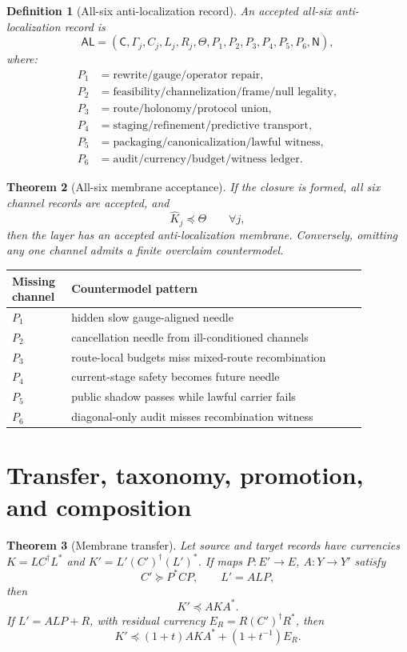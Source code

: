 \documentclass[11pt]{article}
\newtheorem{theorem}{Theorem}[section]
\newtheorem{definition}[theorem]{Definition}
\newcommand{\AL}{\mathsf{AL}}
\begin{document}
\begin{definition}[All-six anti-localization record]
An accepted all-six anti-localization record is
\[
\AL=(\mathsf C,\Gamma_j,C_j,L_j,R_j,\Theta,P_1,P_2,P_3,P_4,P_5,P_6,\mathsf N),
\]
where:
\begin{align*}
P_1&=\text{rewrite/gauge/operator repair},\\
P_2&=\text{feasibility/channelization/frame/null legality},\\
P_3&=\text{route/holonomy/protocol union},\\
P_4&=\text{staging/refinement/predictive transport},\\
P_5&=\text{packaging/canonicalization/lawful witness},\\
P_6&=\text{audit/currency/budget/witness ledger}.
\end{align*}
\end{definition}

\begin{theorem}[All-six membrane acceptance]
If the closure is formed, all six channel records are accepted, and
\[
  \widehat K_j\preceq\Theta\qquad\forall j,
\]
then the layer has an accepted anti-localization membrane.  Conversely, omitting any one channel admits a finite overclaim countermodel.
\end{theorem}

\begin{longtable}{p{0.13\linewidth}p{0.75\linewidth}}
\toprule
Missing channel & Countermodel pattern\\
\midrule
\(P_1\) & hidden slow gauge-aligned needle\\
\(P_2\) & cancellation needle from ill-conditioned channels\\
\(P_3\) & route-local budgets miss mixed-route recombination\\
\(P_4\) & current-stage safety becomes future needle\\
\(P_5\) & public shadow passes while lawful carrier fails\\
\(P_6\) & diagonal-only audit misses recombination witness\\
\bottomrule
\end{longtable}

\section{Transfer, taxonomy, promotion, and composition}

\begin{theorem}[Membrane transfer]
Let source and target records have currencies \(K=LC^\dagger L^*\) and \(K'=L'(C')^\dagger(L')^*\).  If maps \(P:E'\to E\), \(A:Y\to Y'\) satisfy
\[
  C'\succeq P^*CP,
  \qquad L'=ALP,
\]
then
\[
  K'\preceq AKA^*.
\]
If \(L'=ALP+R\), with residual currency \(E_R=R(C')^\dagger R^*\), then
\[
  K'\preceq(1+t)AKA^*+(1+t^{-1})E_R.
\]
\end{theorem}
\end{document}
